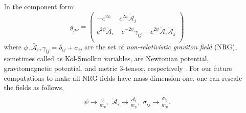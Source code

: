 In the component form:
$$g_{\mu\nu}=
\begin{pmatrix}
-e^{2\psi} & e^{2\psi} \tilde{\mathcal{A}}_{j}\\
e^{2\psi} \tilde{\mathcal{A}}_{i} & \,\,e^{-2\psi}\gamma_{ij}-e^{2\psi}\tilde{\mathcal{A}}_{i}\tilde{\mathcal{A}}_{j}\\
\end{pmatrix}$$
where $\psi,\tilde{\mathcal{A}_i},\gamma_{ij}=\delta_{ij}+\sigma_{ij}$ are the set of \textit{non-relativistic graviton field} (NRG), sometimes called as Kol-Smolkin variables, are Newtonian potential, gravitomagnetic potential, and metric 3-tensor, respectively \cite{Kol:2007bc}.
For our future computations to make all NRG fields have mass-dimension one, one can rescale the fields as follows,
\begin{align}
    \begin{split}
        \psi\rightarrow\frac{\psi}{m_p},\,\,\tilde{\mathcal{A}}_{i}\rightarrow\frac{\tilde{\mathcal{A}}_{i}}{m_p},\,\,\sigma_{ij}\rightarrow \frac{\sigma_{ij}}{m_p}.
    \end{split}
\end{align}
